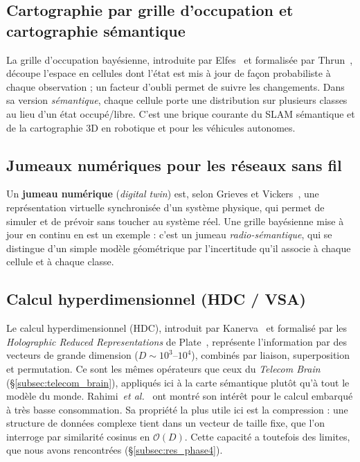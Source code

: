 \documentclass[12pt,a4paper,titlepage]{article}
\begin{document}
\subsection{Cartographie par grille d'occupation et cartographie sémantique}
\label{subsec:art_occupancy}

La grille d'occupation bayésienne, introduite par Elfes~\cite{elfes_occupancy} et formalisée par Thrun~\cite{thrun_occupancy}, découpe l'espace en cellules dont l'état est mis à jour de façon probabiliste à chaque observation ; un facteur d'oubli permet de suivre les changements. Dans sa version \textit{sémantique}, chaque cellule porte une distribution sur plusieurs classes au lieu d'un état occupé/libre. C'est une brique courante du SLAM sémantique et de la cartographie 3D en robotique et pour les véhicules autonomes.

\subsection{Jumeaux numériques pour les réseaux sans fil}
\label{subsec:art_twin}

Un \textbf{jumeau numérique} (\textit{digital twin}) est, selon Grieves et Vickers~\cite{grieves_digital_twin}, une représentation virtuelle synchronisée d'un système physique, qui permet de simuler et de prévoir sans toucher au système réel. Une grille bayésienne mise à jour en continu en est un exemple : c'est un jumeau \textit{radio-sémantique}, qui se distingue d'un simple modèle géométrique par l'incertitude qu'il associe à chaque cellule et à chaque classe.

\subsection{Calcul hyperdimensionnel (HDC / VSA)}
\label{subsec:art_hdc}

Le calcul hyperdimensionnel (HDC), introduit par Kanerva~\cite{kanerva_hdc} et formalisé par les \textit{Holographic Reduced Representations} de Plate~\cite{plate_hrr}, représente l'information par des vecteurs de grande dimension ($D\sim10^3$--$10^4$), combinés par liaison, superposition et permutation. Ce sont les mêmes opérateurs que ceux du \textit{Telecom Brain} (\S\ref{subsec:telecom_brain}), appliqués ici à la carte sémantique plutôt qu'à tout le modèle du monde. Rahimi~\textit{et al.}~\cite{rahimi_hdc} ont montré son intérêt pour le calcul embarqué à très basse consommation. Sa propriété la plus utile ici est la compression : une structure de données complexe tient dans un vecteur de taille fixe, que l'on interroge par similarité cosinus en $\mathcal{O}(D)$. Cette capacité a toutefois des limites, que nous avons rencontrées (\S\ref{subsec:res_phase4}).
\end{document}
